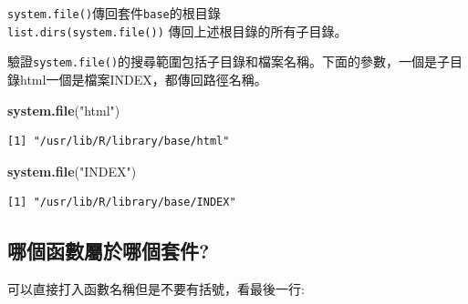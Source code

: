 \documentclass[]{book}
\newenvironment{Shaded}{\begin{snugshade}}{\end{snugshade}}
\newcommand{\KeywordTok}[1]{\textcolor[rgb]{0.13,0.29,0.53}{\textbf{#1}}}
\newcommand{\NormalTok}[1]{#1}
\newcommand{\StringTok}[1]{\textcolor[rgb]{0.31,0.60,0.02}{#1}}
\theoremstyle{definition}
\theoremstyle{definition}
\theoremstyle{definition}
\theoremstyle{remark}
\begin{document}
\texttt{system.file()}傳回套件\texttt{base}的根目錄\\
\texttt{list.dirs(system.file())} 傳回上述根目錄的所有子目錄。

驗證\texttt{system.file()}的搜尋範圍包括子目錄和檔案名稱。下面的參數，一個是子目錄html一個是檔案INDEX，都傳回路徑名稱。

\begin{Shaded}
\begin{Highlighting}[]
\KeywordTok{system.file}\NormalTok{(}\StringTok{"html"}\NormalTok{)}
\end{Highlighting}
\end{Shaded}

\begin{verbatim}
[1] "/usr/lib/R/library/base/html"
\end{verbatim}

\begin{Shaded}
\begin{Highlighting}[]
\KeywordTok{system.file}\NormalTok{(}\StringTok{"INDEX"}\NormalTok{)}
\end{Highlighting}
\end{Shaded}

\begin{verbatim}
[1] "/usr/lib/R/library/base/INDEX"
\end{verbatim}

\subsection{哪個函數屬於哪個套件?}

可以直接打入函數名稱但是不要有括號，看最後一行:
\end{document}
